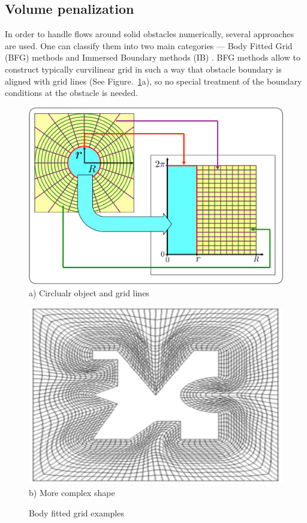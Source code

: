\subsection{Volume penalization}
In order to handle flows around solid obstacles numerically, several approaches are used. One can classify them into two main categories --- Body Fitted Grid (BFG) methods and Immersed Boundary methods (IB) \cite{lib:ib_peskin}. BFG methods allow to construct typically curvilinear grid in such a way that obstacle boundary is aligned with grid lines (See Figure.~\ref{fig:radial2rect}a), so no special treatment of the boundary conditions at the obstacle is needed.
\begin{figure}[t]
\begin{minipage}{0.5\linewidth}
\includegraphics[width=\linewidth]{fig/radial2rect.pdf}
a) Circlualr object and grid lines \label{fig:radial2rect_a}
\end{minipage}
\begin{minipage}{0.5\linewidth}
\includegraphics[width=\linewidth]{fig/weird_shape.pdf}
\centering b) More complex shape \label{fig:radial2rect_b}
\end{minipage}
\caption{Body fitted grid examples} \label{fig:radial2rect}
\end{figure}\\
